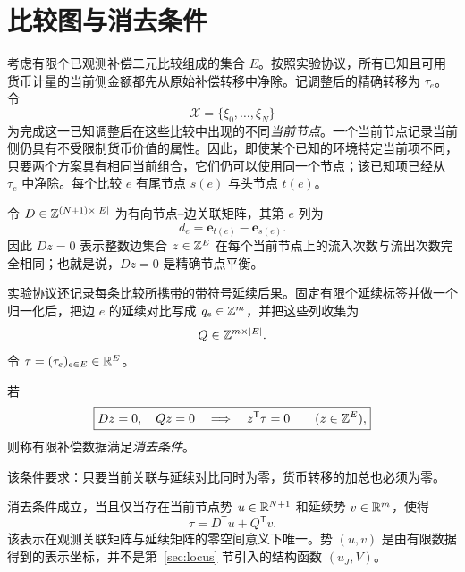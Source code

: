 \section{比较图与消去条件}
\label{sec:cancellation}

考虑有限个已观测补偿二元比较组成的集合 $E$。按照实验协议，所有已知且可用货币计量的当前侧金额都先从原始补偿转移中净除。记调整后的精确转移为 $\tau_e$。令
\[
\mathcal X=\{\xi_0,\ldots,\xi_N\}
\]
为完成这一已知调整后在这些比较中出现的不同\emph{当前节点}。一个当前节点记录当前侧仍具有不受限制货币价值的属性。因此，即使某个已知的环境特定当前项不同，只要两个方案具有相同当前组合，它们仍可以使用同一个节点；该已知项已经从 $\tau_e$ 中净除。每个比较 $e$ 有尾节点 $s(e)$ 与头节点 $t(e)$。

令 $D\in\mathbb Z^{(N+1)\times |E|}$ 为有向节点--边关联矩阵，其第 $e$ 列为
\begin{equation}
 d_e=\mathbf e_{t(e)}-\mathbf e_{s(e)}.
 \label{eq:current-incidence}
\end{equation}
因此 $Dz=0$ 表示整数边集合 $z\in\mathbb Z^{E}$ 在每个当前节点上的流入次数与流出次数完全相同；也就是说，$Dz=0$ 是精确节点平衡。

实验协议还记录每条比较所携带的带符号延续后果。固定有限个延续标签并做一个归一化后，把边 $e$ 的延续对比写成 $q_e\in\mathbb Z^m$，并把这些列收集为
\[
Q\in\mathbb Z^{m\times |E|}.
\]
令 $\tau=(\tau_e)_{e\in E}\in\mathbb R^{E}$。

\begin{definition}[消去条件]
\label{def:joint-cancellation}
若
\begin{equation}
\boxed{
Dz=0,\quad Qz=0
\quad\Longrightarrow\quad
z^{\mathsf T}\tau=0
\qquad(z\in\mathbb Z^{E}),}
\label{eq:joint-cancellation}
\end{equation}
则称有限补偿数据满足\emph{消去条件}。
\end{definition}

该条件要求：只要当前关联与延续对比同时为零，货币转移的加总也必须为零。

\begin{theorem}[加法货币表示]
\label{thm:additive-graph}
消去条件成立，当且仅当存在当前节点势 $u\in\mathbb R^{N+1}$ 和延续势 $v\in\mathbb R^m$，使得
\begin{equation}
\boxed{
\tau=D^{\mathsf T}u+Q^{\mathsf T}v.}
\label{eq:graph-representation}
\end{equation}
该表示在观测关联矩阵与延续矩阵的零空间意义下唯一。势 $(u,v)$ 是由有限数据得到的表示坐标，并不是第~\ref{sec:locus} 节引入的结构函数 $(u_J,V)$。
\end{theorem}

